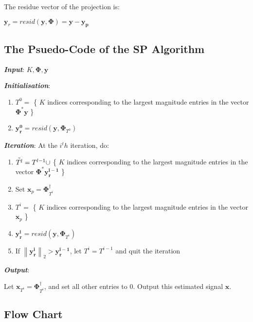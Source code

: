 \documentclass[fleqn, 11pt]{article}
\newcommand{\bs}[1]{\boldsymbol{#1}}
\newcommand\norm[1]{\left\lVert#1\right\rVert}
\begin{document}
\medskip

The residue vector of the projection is: 
\begin{center}
    $\bs{y}_r = resid( \bs{y} ,\bs{\Phi}  )  = \bs{y - y_p } $ 
\end{center}


\newpage 


\subsection*{The Psuedo-Code of the SP Algorithm}

\medskip

\textbf{\textit{Input}}: $K, \bs{\Phi}, \bs{y}$

\medskip

\textbf{\textit{Initialisation}}:
\begin{enumerate}
    \item $T^0 = $ \{ $K$ indices corresponding to the largest magnitude entries in the vector $\bs{\Phi^*y}$ \} 
    \item $\bs{y^0_r}  = resid ( \bs{y}, \bs{\Phi}_{T^0} ) $
\end{enumerate}

\textbf{\textit{Iteration}}:
At the $i^th$ iteration, do:

\begin{enumerate}
    \item $\Tilde{T^l} = T^{l-1} \cup $ \{ $K$ indices corresponding to the largest magnitude entries in the vector $\bs{\Phi^*y^{i-1}_r}$ \}
    \item Set $\bs{x}_p = \bs{\Phi}^{\dagger}_{T^i}  $
    \item $T^i = $ \{ $K$ indices corresponding to the largest magnitude entries in the vector $\bs{x}_p$ \} 
    \item $\bs{y^i_r}  = resid ( \bs{y}, \bs{\Phi}_{T^i} ) $
    \item If $\norm{\bs{y^i_r}  }_2 > \bs{y^{i-1}_r}  $,  let ${T^i}= {T^{i-1}}$ and quit the iteration
\end{enumerate} 

\textbf{\textit{Output}}:

Let $\bs{x}_{T^i} = \bs{\Phi}^{\dagger}_{T^i}  $, and set all other entries to 0. Output this estimated signal $\bs{x}$.

\hrulefill

\subsection*{Flow Chart}
\end{document}
